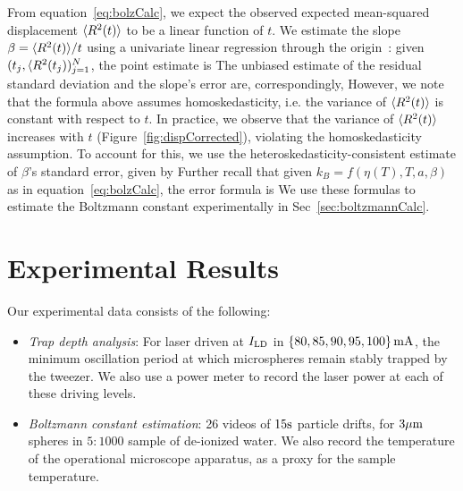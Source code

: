 \documentclass[aps,prb,twocolumn,superscriptaddress,floatfix,longbibliography,citeautoscript]{revtex4-2}
\begin{document}
From equation~\ref{eq:bolzCalc}, we expect the observed expected mean-squared displacement $\langle R^2(t)\rangle$ 
to be a linear function of $t$. We estimate the slope $\beta = \langle R^2(t)\rangle / t$ using 
a univariate linear regression through the origin~\cite{BlitzsteinShephard2024}: 
given $(t_j, \langle R^2(t_j))_{j=1}^N$, the point estimate is 
The unbiased estimate of the residual standard deviation and the slope's error are, 
correspondingly, 
However, we note that the formula above assumes homoskedasticity, i.e. 
the variance of $\langle R^2(t)\rangle$ is constant with respect to $t$. 
In practice, we observe that the variance of $\langle R^2(t)\rangle$ increases with 
$t$ (Figure~\ref{fig:dispCorrected}), violating the homoskedasticity assumption. 
To account for this, we use the heteroskedasticity-consistent estimate of 
$\beta$'s standard error, given by 
Further recall that given $k_B = f(\eta(T), T, a, \beta)$ as in equation~\ref{eq:bolzCalc}, 
the error formula is 
We use these formulas to estimate the Boltzmann constant experimentally in Sec~\ref{sec:boltzmannCalc}. 
\section{\label{sec:analysis}Experimental Results}
Our experimental data consists of the following: 
\begin{itemize}
  \item \textit{Trap depth analysis}: For laser driven at $I_{\mathrm{LD}}$ in $\{80, 85, 90, 95, 100\} \, \mathrm{mA}$, the minimum oscillation period at which microspheres remain stably trapped by the tweezer. We also use a power meter to record the laser power at each of these driving levels. 
  \item \textit{Boltzmann constant estimation}: 26 videos of $15\mathrm{s}$ particle drifts, for $3\mu\mathrm{m}$ spheres in $5:1000$ sample of de-ionized water. We also record the temperature of the operational microscope apparatus, as a proxy for the sample temperature. 
\end{itemize}
\end{document}
